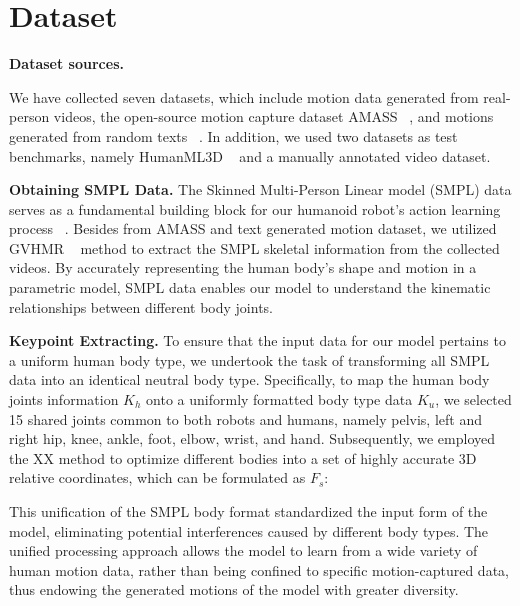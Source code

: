 \section{Dataset}









\textbf{Dataset sources.}

We have collected seven datasets, which include motion data generated from real-person videos, the open-source motion capture dataset AMASS ~\cite{ma2019amass}, and motions generated from random texts ~\cite{shen2024gvhmr,jiang2024motiongpt,tevet2023human,chen2023executing}. In addition, we used two datasets as test benchmarks, namely HumanML3D ~\cite{guo2022humanml3d} and a manually annotated video dataset.

\textbf{Obtaining SMPL Data.}
The Skinned Multi-Person Linear model (SMPL) data serves as a fundamental building block for our humanoid robot's action learning process ~\cite{SMPL2015}. Besides from AMASS and text generated motion dataset, we utilized GVHMR ~\cite{shen2024gvhmr} method to extract the SMPL skeletal information from the collected videos. By accurately representing the human body's shape and motion in a parametric model, SMPL data enables our model to understand the kinematic relationships between different body joints.




\textbf{Keypoint Extracting.}
To ensure that the input data for our model pertains to a uniform human body type, we undertook the task of transforming all SMPL data into an identical neutral body type. Specifically, to map the human body joints information $K_h$ onto a uniformly formatted body type data $K_u$, we selected 15 shared joints common to both robots and humans, namely pelvis, left and right hip, knee, ankle, foot, elbow, wrist, and hand. Subsequently, we employed the {\color{red}XX method} to optimize different bodies into a set of highly accurate 3D relative coordinates, which can be formulated as $F_s$:

This unification of the SMPL body format standardized the input form of the model, eliminating potential interferences caused by different body types. The unified processing approach allows the model to learn from a wide variety of human motion data, rather than being confined to specific motion-captured data, thus endowing the generated motions of the model with greater diversity.


